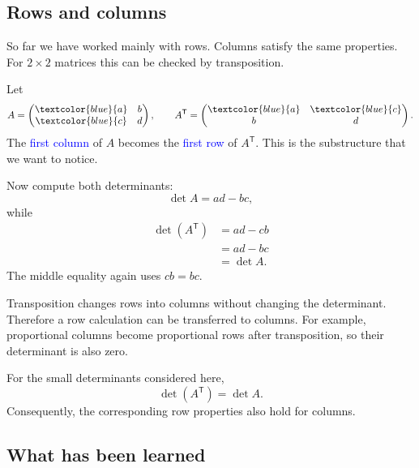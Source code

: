 \subsection{Rows and columns}

So far we have worked mainly with rows. Columns satisfy the same properties. For \(2\times2\) matrices this can be checked by transposition.

Let
\[
A=
\begin{pmatrix}
\textcolor{blue}{a}&b\\
\textcolor{blue}{c}&d
\end{pmatrix},
\qquad
A^{\mathsf T}=
\begin{pmatrix}
\textcolor{blue}{a}&\textcolor{blue}{c}\\
b&d
\end{pmatrix}.
\]
The \textcolor{blue}{first column} of \(A\) becomes the \textcolor{blue}{first row} of \(A^{\mathsf T}\). This is the substructure that we want to notice.

Now compute both determinants:
\[
\det A=ad-bc,
\]
while
\[
\begin{aligned}
\det(A^{\mathsf T})
&=ad-cb\\
&=ad-bc\\
&=\det A.
\end{aligned}
\]
The middle equality again uses \(cb=bc\).

Transposition changes rows into columns without changing the determinant. Therefore a row calculation can be transferred to columns. For example, proportional columns become proportional rows after transposition, so their determinant is also zero.

\begin{theorembox}
For the small determinants considered here,
\[
\det(A^{\mathsf T})=\det A.
\]
Consequently, the corresponding row properties also hold for columns.
\end{theorembox}

\subsection*{What has been learned}

